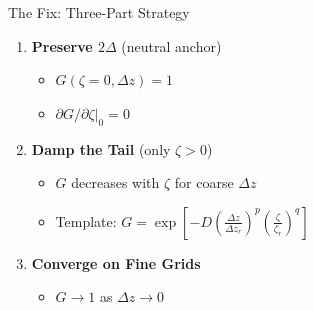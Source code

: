 \documentclass[10pt,aspectratio=169]{beamer}
\begin{document}
\begin{frame}{The Fix: Three-Part Strategy}
  \begin{enumerate}
    \item \textbf{Preserve $2\Delta$} (neutral anchor)
    \begin{itemize}
      \item $G(\zeta=0, \Delta z) = 1$
      \item $\partial G/\partial\zeta|_0 = 0$
    \end{itemize}
    
    \pause
    \item \textbf{Damp the Tail} (only $\zeta > 0$)
    \begin{itemize}
      \item $G$ decreases with $\zeta$ for coarse $\Delta z$
      \item Template: $G = \exp\left[-D \left(\frac{\Delta z}{\Delta z_r}\right)^p \left(\frac{\zeta}{\zeta_r}\right)^q\right]$
    \end{itemize}
    
    \pause
    \item \textbf{Converge on Fine Grids}
    \begin{itemize}
      \item $G \to 1$ as $\Delta z \to 0$
    \end{itemize}
  \end{enumerate}
\end{frame}
\end{document}
